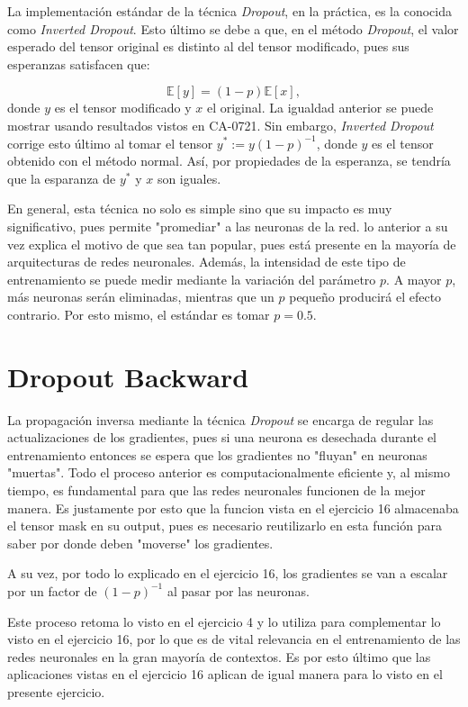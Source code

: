 \documentclass[12pt, letterpaper]{article}
\begin{document}
La implementación estándar de la técnica \textit{Dropout}, en la práctica, es la conocida como \textit{Inverted Dropout}. Esto último se debe a que, en el método \textit{Dropout}, el valor esperado del tensor original es distinto al del tensor modificado, pues sus esperanzas satisfacen que:

$$\mathbb{E}[y]=(1-p)\mathbb{E}[x],$$ donde $y$ es el tensor modificado y $x$ el original. La igualdad anterior se puede mostrar usando resultados vistos en CA-0721. Sin embargo, \textit{Inverted Dropout} corrige esto último al tomar el tensor $y^* := y(1-p)^{-1}$, donde $y$ es el tensor obtenido con el método normal. Así, por propiedades de la esperanza, se tendría que la esparanza de $y^*$ y $x$ son iguales.

En general, esta técnica no solo es simple sino que su impacto es muy significativo, pues permite "promediar" a las neuronas de la red. lo anterior a su vez explica el motivo de que sea tan popular, pues está presente en la mayoría de arquitecturas de redes neuronales. Además, la intensidad de este tipo de entrenamiento se puede medir mediante la variación del parámetro $p$. A mayor $p$, más neuronas serán eliminadas, mientras que un $p$ pequeño producirá el efecto contrario. Por esto mismo, el estándar es tomar $p=0.5$.


\newpage

\section{Dropout Backward}

La propagación inversa mediante la técnica \textit{Dropout} se encarga de regular las actualizaciones de los gradientes, pues si una neurona es desechada durante el entrenamiento entonces se espera que los gradientes no "fluyan" en neuronas "muertas". Todo el proceso anterior es computacionalmente eficiente y, al mismo tiempo, es fundamental para que las redes neuronales funcionen de la mejor manera. Es justamente por esto que la funcion vista en el ejercicio 16 almacenaba el tensor mask en su output, pues es necesario reutilizarlo en esta función para saber por donde deben "moverse" los gradientes.

A su vez, por todo lo explicado en el ejercicio 16, los gradientes se van a escalar por un factor de $(1-p)^{-1}$ al pasar por las neuronas.

Este proceso retoma lo visto en el ejercicio 4 y lo utiliza para complementar lo visto en el ejercicio 16, por lo que es de vital relevancia en el entrenamiento de las redes neuronales en la gran mayoría de contextos. Es por esto último que las aplicaciones vistas en el ejercicio 16 aplican de igual manera para lo visto en el presente ejercicio.
\end{document}

